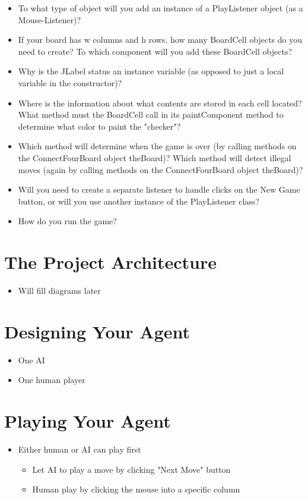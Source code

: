 \documentclass[9pt,b5paper]{article}
\begin{document}
\begin{itemize}
\item To what type of object will you add an instance of a PlayListener object (as a Mouse-Listener)?

\item If your board has w columns and h rows, how many BoardCell objects do you need to create?   To which component will you add these BoardCell objects?

\item Why is the JLabel status an instance variable (as opposed to just a local variable in the constructor)?

\item Where is the information about what contents are stored in each cell located?  What method must the BoardCell call in its paintComponent method to determine what color to paint the "checker"?

\item Which method will determine when the game is over (by calling methods on the ConnectFourBoard object theBoard)?  Which method will detect illegal moves (again by calling methods on the ConnectFourBoard object theBoard)?

\item Will you need to create a separate listener to handle clicks on the New Game button, or will you use another instance of the PlayListener class?

\item How do you run the game?
\end{itemize}

\section{The Project Architecture}
\label{sec-3}
\begin{itemize}
\item Will fill diagrams later
\end{itemize}

\section{Designing Your Agent}
\label{sec-4}
\begin{itemize}
\item One AI
\item One human player
\end{itemize}

\section{Playing Your Agent}
\label{sec-5}
\begin{itemize}
\item Either human or AI can play first
\begin{itemize}
\item Let AI to play a move by clicking "Next Move" button
\item Human play by clicking the mouse into a specific column
\end{itemize}
\end{itemize}
\end{document}
